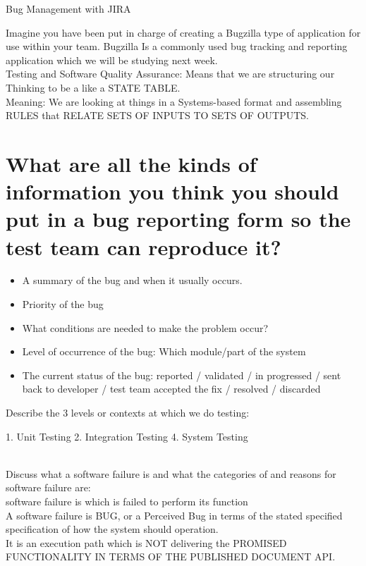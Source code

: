 Bug Management with JIRA

Imagine you have been put in charge of creating a Bugzilla type of application for use within your team. Bugzilla Is a commonly used bug tracking and reporting application which we will be studying next week.
\\

Testing and Software Quality Assurance: Means that we are structuring our Thinking to be a like a STATE TABLE. 
\\
Meaning: We are looking at things in a Systems-based format and assembling RULES that RELATE SETS OF INPUTS TO SETS OF OUTPUTS.

\section{What are all the kinds of information you think you should put in a bug reporting form so the test team can reproduce it?}
\begin{itemize}
    \item A summary of the bug and when it usually occurs.
    \item Priority of the bug  
    \item What conditions are needed to make the problem occur?
    \item Level of occurrence of the bug: Which module/part of the system        
    \item The current status of the bug: reported / validated / in progressed / sent back to developer / test team accepted the fix / resolved / discarded         
\end{itemize}

Describe the 3 levels or contexts at which we do testing:

1. Unit Testing
2. Integration Testing
4. System Testing

\\
Discuss what a software failure is and what the categories of and reasons for software failure are:
\\ 
software failure is which is failed to perform its function
\\
A software failure is BUG, or a Perceived Bug in terms of the stated specified specification of how the system should operation.
\\
It is an execution path which is NOT delivering the PROMISED FUNCTIONALITY IN TERMS OF THE PUBLISHED DOCUMENT API.

